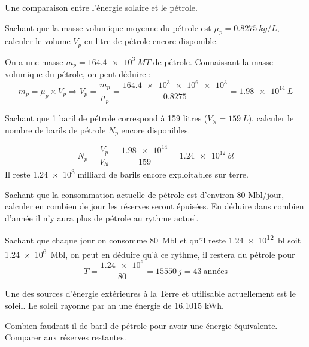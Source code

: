 \documentclass[10pt,fleqn]{article} %
\begin{document}
\begin{exercise}
Une comparaison entre l'énergie solaire et le pétrole. 
\begin{question}
Sachant que la masse volumique moyenne du pétrole est
$\mu_p = \SI{0,8275}{kg/L}$, calculer le volume $V_p$ en litre de pétrole encore
disponible.
\end{question}

\begin{solution}
On a une masse $m_p = \SI{164.4e3}{MT}$ de pétrole. Connaissant la masse volumique du pétrole, on peut déduire : $$ m_p = \mu_p \times V_p \Rightarrow V_p = \frac{m_p}{\mu_p} = \frac{\num{164.4e3}\num{e6}\num{e3}}{0.8275} = \SI{1.98e14}{L} $$
\end{solution}

\begin{question}
Sachant que 1 baril de pétrole correspond à 159 litres ($V_{bl} = \SI{159}{L}$),
calculer le nombre de barils de pétrole $N_p$ encore disponibles.
\end{question}
\begin{solution}
$$N_p = \frac{V_p}{V_{bl}} = \frac{\num{1,98e14}}{159} = \SI{1,24e12}{bl}$$
Il reste \num{1,24e3} milliard de barils encore exploitables sur terre. 
\end{solution}

\begin{question}
    Sachant que la consommation actuelle de pétrole est d’environ
80 Mbl/jour, calculer en combien de jour les réserves seront
épuisées. En déduire dans combien d’année il n’y aura plus de
pétrole au rythme actuel.
\end{question}
\begin{solution}
    Sachant que chaque jour on consomme \SI{80}{Mbl} et qu'il reste \SI{1,24e12}{bl} soit \SI{1,24e6}{Mbl}, on peut en déduire qu'à ce rythme, il restera du pétrole pour $$T = \frac{\num{1,24e6}}{\num{80}} = \SI{15550}{j} = \SI{43}{\text{années}}$$
\end{solution}

Une des sources d'énergie extérieures à la Terre et utilisable
actuellement est le soleil. Le soleil rayonne par an une énergie de
16.1015 kWh.

\begin{question}
    Combien faudrait-il de baril de pétrole pour avoir une énergie
équivalente. Comparer aux réserves restantes.
\end{question}


\end{exercise}
\end{document}
